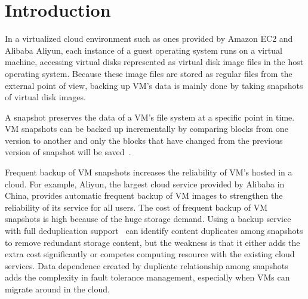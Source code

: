 \section{Introduction}


In a virtualized cloud environment such as ones provided by Amazon EC2 and  Alibaba Aliyun,
each instance of a guest operating system runs on a virtual machine, accessing
virtual disks represented as virtual disk image files  in the host operating system.
Because these image files are stored as regular files from the external point of view,
backing up VM's data is mainly done by taking snapshots of virtual disk images.

A snapshot preserves the data of a VM's file system at a specific point in time. 
VM snapshots can be  backed up  incrementally by comparing blocks from one version to another 
and only the blocks that have changed from the previous version of snapshot will be saved~\cite{Clements2009,Vrable2009}. 

Frequent  backup of VM snapshots increases  the reliability of VM's hosted in a cloud.
For example, Aliyun, the largest cloud service provided by Alibaba in China, 
provides automatic frequent backup of VM images to strengthen the reliability of its service for all users.
The cost of frequent backup of VM snapshots is  high because of the huge storage demand.
Using a backup service with full deduplication support~\cite{venti02,bottleneck08,extreme_binning09,sparseindex09}
can identify content duplicates among snapshots to remove redundant storage content,  but the weakness is that it
either adds the  extra cost significantly or competes computing resource with the existing cloud services.
Data dependence created by duplicate relationship among snapshots
adds the complexity in fault tolerance management, especially when  VMs can migrate around in the cloud. 

